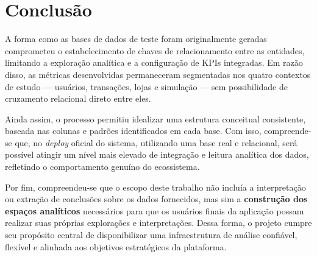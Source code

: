 \documentclass[12pt]{article}
\begin{document}
\section{Conclusão}

A forma como as bases de dados de teste foram originalmente geradas comprometeu o estabelecimento de chaves de relacionamento entre as entidades, limitando a exploração analítica e a configuração de KPIs integradas. Em razão disso, as métricas desenvolvidas permaneceram segmentadas nos quatro contextos de estudo — usuários, transações, lojas e simulação — sem possibilidade de cruzamento relacional direto entre eles.

Ainda assim, o processo permitiu idealizar uma estrutura conceitual consistente, baseada nas colunas e padrões identificados em cada base. Com isso, compreende-se que, no \textit{deploy} oficial do sistema, utilizando uma base real e relacional, será possível atingir um nível mais elevado de integração e leitura analítica dos dados, refletindo o comportamento genuíno do ecossistema.

Por fim, compreendeu-se que o escopo deste trabalho não incluía a interpretação ou extração de conclusões sobre os dados fornecidos, mas sim a \textbf{construção dos espaços analíticos} necessários para que os usuários finais da aplicação possam realizar suas próprias explorações e interpretações. Dessa forma, o projeto cumpre seu propósito central de disponibilizar uma infraestrutura de análise confiável, flexível e alinhada aos objetivos estratégicos da plataforma.
\end{document}

